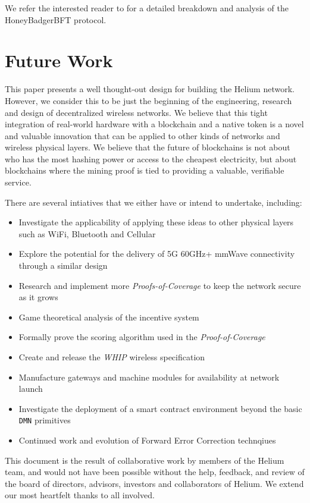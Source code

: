 \documentclass[10pt, nonatbib, nocopyrightspace, reprint]{sigplanconf}
\begin{document}
We refer the interested reader to \cite{honeybadger} for a detailed breakdown and analysis of the HoneyBadgerBFT protocol.

\section{Future Work}

This paper presents a well thought-out design for building the Helium network. However, we consider this to be just the beginning of the engineering, research and design of decentralized wireless networks. We believe that this tight integration of real-world hardware with a blockchain and a native token is a novel and valuable innovation that can be applied to other kinds of networks and wireless physical layers. We believe that the future of blockchains is not about who has the most hashing power or access to the cheapest electricity, but about blockchains where the mining proof is tied to providing a valuable, verifiable service.

There are several intiatives that we either have or intend to undertake, including:

\begin{itemize}
    \item Investigate the applicability of applying these ideas to other physical layers such as WiFi, Bluetooth and Cellular
    \item Explore the potential for the delivery of 5G 60GHz+ mmWave connectivity through a similar design
    \item Research and implement more \emph{Proofs-of-Coverage} to keep the network secure as it grows
    \item Game theoretical analysis of the incentive system
    \item Formally prove the scoring algorithm used in the \emph{Proof-of-Coverage}
    \item Create and release the \emph{WHIP} wireless specification
    \item Manufacture gateways and machine modules for availability at network launch
    \item Investigate the deployment of a smart contract environment beyond the basic \verb|DMN| primitives
    \item Continued work and evolution of Forward Error Correction technqiues
\end{itemize}

\acks

This document is the result of collaborative work by members of the Helium team, and would not have been possible without the help, feedback, and review of the board of directors, advisors, investors and collaborators of Helium. We extend our most heartfelt thanks to all involved.
\end{document}
